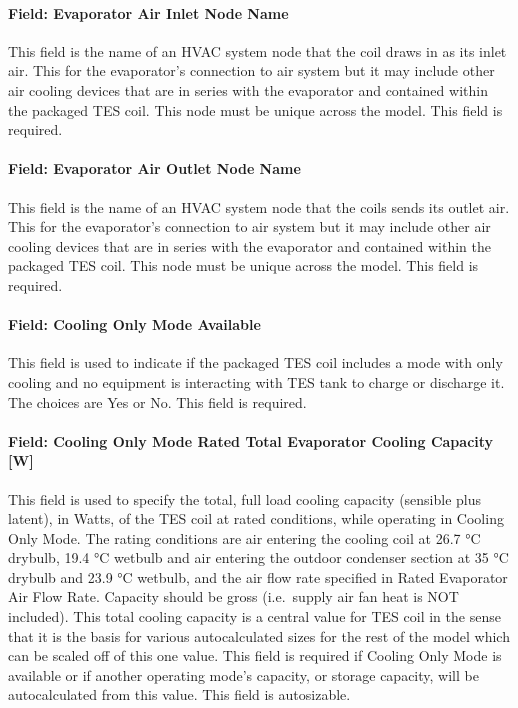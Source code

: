 \paragraph{Field: Evaporator Air Inlet Node Name}\label{field-evaporator-air-inlet-node-name-3}

This field is the name of an HVAC system node that the coil draws in as its inlet air. This for the evaporator's connection to air system but it may include other air cooling devices that are in series with the evaporator and contained within the packaged TES coil. This node must be unique across the model. This field is required.

\paragraph{Field: Evaporator Air Outlet Node Name}\label{field-evaporator-air-outlet-node-name-2}

This field is the name of an HVAC system node that the coils sends its outlet air. This for the evaporator's connection to air system but it may include other air cooling devices that are in series with the evaporator and contained within the packaged TES coil. This node must be unique across the model. This field is required.

\paragraph{Field: Cooling Only Mode Available}\label{field-cooling-only-mode-available}

This field is used to indicate if the packaged TES coil includes a mode with only cooling and no equipment is interacting with TES tank to charge or discharge it. The choices are Yes or No. This field is required.

\paragraph{Field: Cooling Only Mode Rated Total Evaporator Cooling Capacity {[}W{]}}\label{field-cooling-only-mode-rated-total-evaporator-cooling-capacity-w}

This field is used to specify the total, full load cooling capacity (sensible plus latent), in Watts, of the TES coil at rated conditions, while operating in Cooling Only Mode. The rating conditions are air entering the cooling coil at 26.7 °C drybulb, 19.4 °C wetbulb and air entering the outdoor condenser section at 35 °C drybulb and 23.9 °C wetbulb, and the air flow rate specified in Rated Evaporator Air Flow Rate. Capacity should be gross (i.e.~supply air fan heat is NOT included). This total cooling capacity is a central value for TES coil in the sense that it is the basis for various autocalculated sizes for the rest of the model which can be scaled off of this one value. This field is required if Cooling Only Mode is available or if another operating mode's capacity, or storage capacity, will be autocalculated from this value. This field is autosizable.

